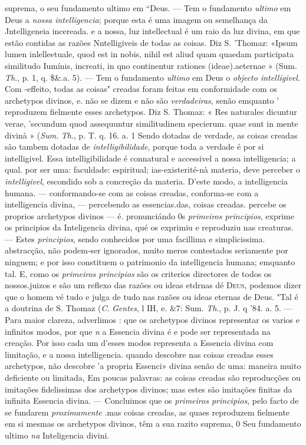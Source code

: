suprema, o seu fundamento ultimo em “Deus. --- Tem o fundamento \emph{ultimo} em Deus a \emph{nossa intelligencia}; porque esta é uma imagem ou semelhança da Jntelligeneia incereada. e a nossa, luz intellectual é um raio da luz divina, em que estão contidas as razões Nntelligiveis de todas as coisas. Diz S. 'Thomaz: «Ipsum lumen inlelleetuale, quod est in nobis, nihil est aliud quam quaedam participata similitudo Iumínis, increati, in qno continentur rationes (ideae).aeternae » (Sum. \emph{Th}., p. 1, q. \$\&.a. 5). --- Tem o fundamento \emph{ultimo} em Deus o \emph{objecto intelligivel}. Com -effeito, todas as coisas" creadas foram feitas em conformidade com os archetypos divinos, e. não se dizem e não são \emph{verdadeiras}, senão emquanto ' reproduzem fielmente esses archetypos. Diz S. Thomaz: « Res naturales dicuntur verae, 'secundum quod assequuntur similitudinem specierum. quae sunt in mente divinà » (\emph{Sum}. \emph{Th}., p. T. q. 16. a. 1 Sendo dotadas de verdade, as coisas creadas são tambem dotadas de \emph{intelligibilidade}, porque toda a verdade é por si intelligivel. Essa intelligibilidade é connatural e accessivel a nossa intelligencia; a qual. por ser uma: faculdade: espiritual; ias-existerité-nà materia, deve perceber o \emph{intelligivel}, escondido sob a concreção da materia. D'este modo, a intelligencia humana. --- conformando-se com as coisas creadas, conforma-se com a intelligencia divina, --- percebendo as essencias.das, coisas creadas. percebe os proprios archetypos divinos --- é. pronunciándo 0s \emph{primeiros principios}, exprime os principios da Inteligencia divina, qué os exprimiu e reproduziu nas creaturas. --- Estes \emph{principios}, sendo conhecidos por uma facillima e simplicissima. abstracção, não podem-ser ignorados, muito meros contestados seriamente por ninguem; e por isso constituem o patrimonio da intelligencia humana; emquanto tal. E, como os \emph{primeiros principios} são os criterios directores de todos os nossos.juizos e são um reflexo das razões ou ideas etdrnas dé \textsc{Deus}, podemos dizer que o homem vé tudo e julga de tudo nas razões ou ideas eternas de Deus. "Tal é a doutrina de S. Thomaz (\emph{C}. \emph{Gentes}, l IH, e. \&7: Sum. \emph{Th}., p. J. q '84. a. 5. --- Para maior clareza, adverlimos : que os archetypos divinos representar os varios e infinitos modos, por que \emph{n} a Essencia divina é e pode ser representada na creação. Por isso cada um d'esses modos representa a Essencia divina com limitação, e a nossa intelligencia. quando descobre nas coisas creadas esses archetypos, não descobre 'a propria Essenci» divina senão dc uma: maneira muito deficiente ou limitada, Em poucas palavras: as coisas creadas são reproducções ou imitações fidelissimas dos archetypos divinos; mas estes são imitações finitas da infinita Essencia divina. --- Concluimos que os \emph{primeiros principios}, pelo facto de se fundarem \emph{proximamente} .mas coisas creadas, as quaes reproduzem fielmente em si mesmas os archetypos divinos, têm a sua razito suprema, 0 Seu fundamento ultimo \emph{na} Inteligencia divini.

